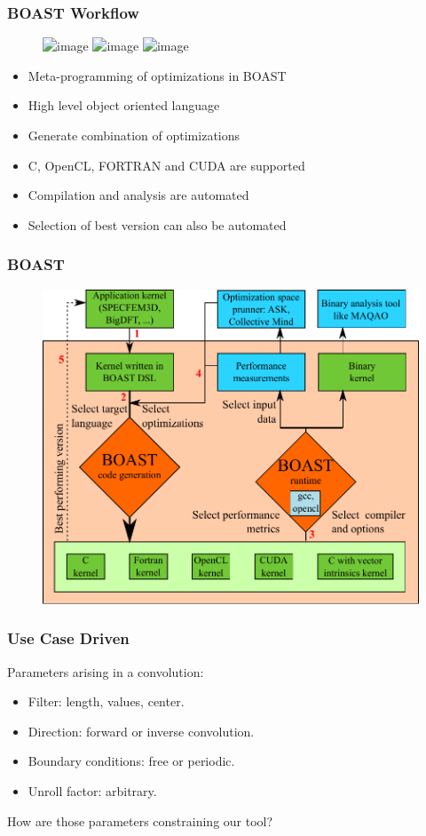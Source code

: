 \documentclass{beamer}
\begin{document}
\begin{frame}
\frametitle{BOAST Workflow}
\begin{figure}
\centering
\includegraphics<1>[scale=1]{Workflow2-1}
\includegraphics<2>[scale=1]{Workflow2-2}
\includegraphics<3>[scale=1]{Workflow2-3}
\label{fig:2filters}
\end{figure}
\begin{itemize}
\item<1|only@1> Meta-programming of optimizations in BOAST
\item<1|only@1> High level object oriented language
\item<2|only@2> Generate combination of optimizations
\item<2|only@2> C, OpenCL, FORTRAN and CUDA are supported
\item<3|only@3> Compilation and analysis are automated
\item<3|only@3> Selection of best version can also be automated
\end{itemize}
\end{frame}

\begin{frame}
\frametitle{BOAST}
\begin{figure}
\centering
\includegraphics[scale=0.5]{BOAST}
\end{figure}
\end{frame}

\begin{frame}
\frametitle{Use Case Driven}
Parameters arising in a convolution:
\begin{itemize}
\item Filter: length, values, center.
\item Direction: forward or inverse convolution.
\item Boundary conditions: free or periodic.
\item Unroll factor: arbitrary.
\end{itemize}
How are those parameters constraining our tool?
\end{frame}
\end{document}

